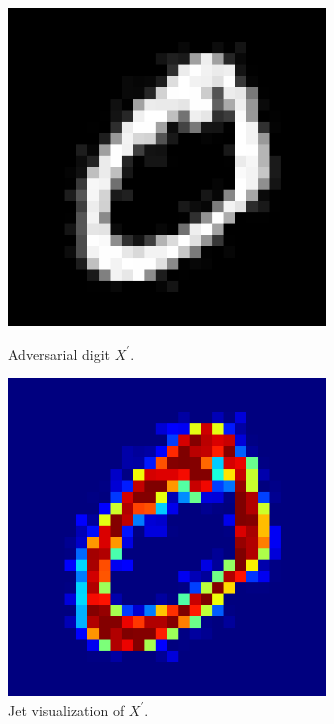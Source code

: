 \documentclass{beamer}
\begin{document}
\begin{frame}
	\begin{figure}[H]
		\begin{minipage}[t]{0.3\linewidth}
			\centering
			\includegraphics[width=0.75\textwidth]{img/advpixel/xadv.png}
			\caption{\small Adversarial digit $X^\prime$.}
		\end{minipage}        
		\hspace{.1cm}
		\begin{minipage}[t]{0.3\linewidth}
			\centering
			\includegraphics[width=0.75\textwidth]{img/advpixel/advjet.png}
			\caption{\small Jet visualization of $X^\prime$.}
		\end{minipage}
		\hspace{.1cm}
		\begin{minipage}[t]{0.3\linewidth}

\end{minipage}
\end{figure}
\end{frame}
\end{document}
